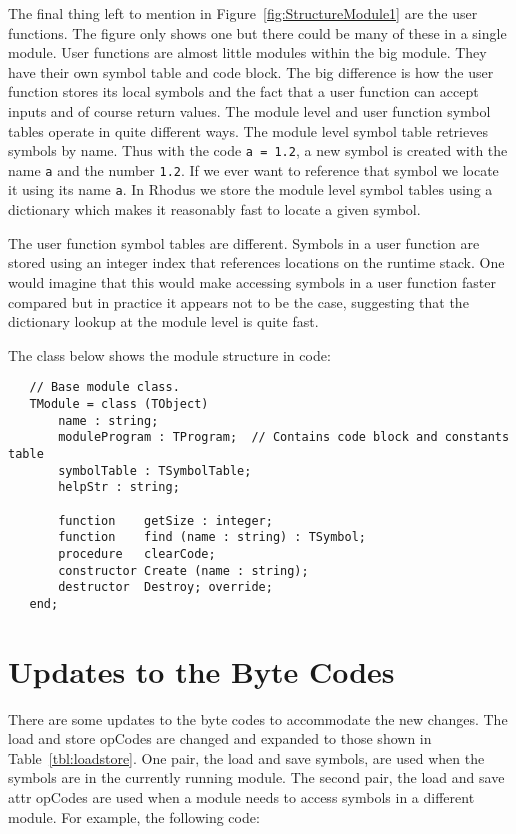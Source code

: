 The final thing left to mention in Figure~\ref{fig:StructureModule1} are the user functions. The figure only shows one but there could be many of these in a single module. User functions are almost little modules within the big module. They have their own symbol table and code block. The big difference is how the user function stores its local symbols and the fact that a user function can accept inputs and of course return values. The module level and user function symbol tables operate in quite different ways. The module level symbol table retrieves symbols by name. Thus with the code {\tt a = 1.2}, a new symbol is created with the name {\tt a} and the number {\tt 1.2}. If we ever want to reference that symbol we locate it using its name {\tt a}. In Rhodus we store the module level symbol tables using a dictionary which makes it reasonably fast to locate a given symbol.

The user function symbol tables are different. Symbols in a user function are stored using an integer index that references locations on the runtime stack. One would imagine that this would make accessing symbols in a user function faster compared but in practice it appears not to be the case, suggesting that the dictionary lookup at the module level is quite fast.

The class below shows the module structure in code:

\begin{lstlisting}
   // Base module class. 
   TModule = class (TObject)
       name : string;
       moduleProgram : TProgram;  // Contains code block and constants table
       symbolTable : TSymbolTable;
       helpStr : string;

       function    getSize : integer;
       function    find (name : string) : TSymbol;
       procedure   clearCode;
       constructor Create (name : string);
       destructor  Destroy; override;
   end;
\end{lstlisting}   
   
\section{Updates to the Byte Codes}

There are some updates to the byte codes to accommodate the new changes. The load and store opCodes are changed and expanded to those shown in Table~\ref{tbl:loadstore}. One pair, the load and save symbols, are used when the symbols are in the currently running module. The second pair, the load and save attr opCodes are used when a module needs to access symbols in a different module. For example, the following code:

